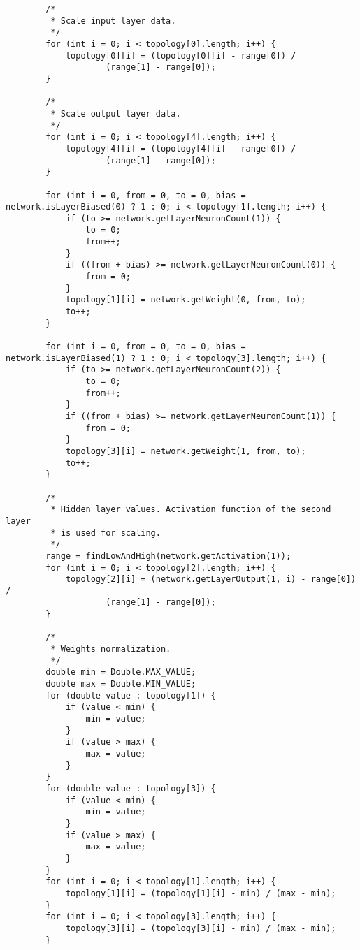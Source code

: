 \begin{verbatim}
        /*
         * Scale input layer data.
         */
        for (int i = 0; i < topology[0].length; i++) {
            topology[0][i] = (topology[0][i] - range[0]) /
                    (range[1] - range[0]);
        }

        /*
         * Scale output layer data.
         */
        for (int i = 0; i < topology[4].length; i++) {
            topology[4][i] = (topology[4][i] - range[0]) /
                    (range[1] - range[0]);
        }

        for (int i = 0, from = 0, to = 0, bias = network.isLayerBiased(0) ? 1 : 0; i < topology[1].length; i++) {
            if (to >= network.getLayerNeuronCount(1)) {
                to = 0;
                from++;
            }
            if ((from + bias) >= network.getLayerNeuronCount(0)) {
                from = 0;
            }
            topology[1][i] = network.getWeight(0, from, to);
            to++;
        }

        for (int i = 0, from = 0, to = 0, bias = network.isLayerBiased(1) ? 1 : 0; i < topology[3].length; i++) {
            if (to >= network.getLayerNeuronCount(2)) {
                to = 0;
                from++;
            }
            if ((from + bias) >= network.getLayerNeuronCount(1)) {
                from = 0;
            }
            topology[3][i] = network.getWeight(1, from, to);
            to++;
        }

        /*
         * Hidden layer values. Activation function of the second layer
         * is used for scaling.
         */
        range = findLowAndHigh(network.getActivation(1));
        for (int i = 0; i < topology[2].length; i++) {
            topology[2][i] = (network.getLayerOutput(1, i) - range[0]) /
                    (range[1] - range[0]);
        }

        /*
         * Weights normalization.
         */
        double min = Double.MAX_VALUE;
        double max = Double.MIN_VALUE;
        for (double value : topology[1]) {
            if (value < min) {
                min = value;
            }
            if (value > max) {
                max = value;
            }
        }
        for (double value : topology[3]) {
            if (value < min) {
                min = value;
            }
            if (value > max) {
                max = value;
            }
        }
        for (int i = 0; i < topology[1].length; i++) {
            topology[1][i] = (topology[1][i] - min) / (max - min);
        }
        for (int i = 0; i < topology[3].length; i++) {
            topology[3][i] = (topology[3][i] - min) / (max - min);
        }


\end{verbatim}
